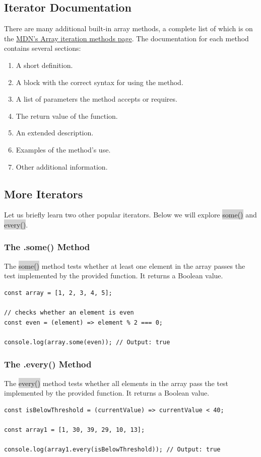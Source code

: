 \documentclass[11pt]{article}
\begin{document}
\subsection{Iterator Documentation}
There are many additional built-in array methods, a complete list of which is on the 
\href{https://developer.mozilla.org/en-US/docs/Web/JavaScript/Reference/Global_Objects/Array}{MDN’s Array iteration methods page}.
The documentation for each method contains several sections:
\begin{enumerate}[leftmargin = *]
\item A short definition.
\item A block with the correct syntax for using the method.
\item A list of parameters the method accepts or requires.
\item The return value of the function.
\item An extended description.
\item Examples of the method’s use.
\item Other additional information.
\end{enumerate}

\subsection{More Iterators}
Let us briefly learn two other popular iterators. Below we will explore \colorbox{lightgray}{some()} and \colorbox{lightgray}{every()}.
\subsubsection{The .some() Method}
The \colorbox{lightgray}{some()} method tests whether at least one element in the array passes the test implemented by the provided function. It returns a Boolean value.
\begin{lstlisting}
const array = [1, 2, 3, 4, 5];

// checks whether an element is even
const even = (element) => element % 2 === 0;

console.log(array.some(even)); // Output: true
\end{lstlisting}

\subsubsection{The .every() Method}
The \colorbox{lightgray}{every()} method tests whether all elements in the array pass the test implemented by the provided function. It returns a Boolean value.
\begin{lstlisting}
const isBelowThreshold = (currentValue) => currentValue < 40;

const array1 = [1, 30, 39, 29, 10, 13];

console.log(array1.every(isBelowThreshold)); // Output: true
\end{lstlisting}
\end{document}
